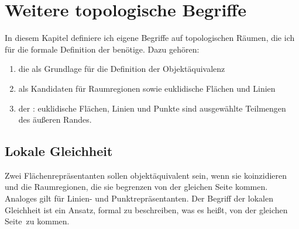 \chapter{Weitere topologische Begriffe}\label{chap:topologie-erweiterung}

In diesem Kapitel definiere ich eigene Begriffe auf topologischen Räumen, die ich für die formale Definition der \strukt benötige.
Dazu gehören:
\begin{enumerate}
    \item die  als Grundlage für die Definition der Objektäquivalenz
    \item {} als Kandidaten für Raumregionen sowie euklidische Flächen und Linien
    \item der : euklidische Flächen, Linien und Punkte sind ausgewählte Teilmengen des äußeren Randes.
\end{enumerate}


    


\section{Lokale Gleichheit}\label{sec:lokale-gleichheit}
    Zwei
    Flächenrepräsentanten sollen objektäquivalent sein, 
    wenn sie koinzidieren und die Raumregionen, die sie begrenzen \glqq von der gleichen Seite kommen\grqq. 
    Analoges gilt für Linien- und Punktrepräsentanten. 
    Der Begriff der lokalen Gleichheit ist ein Ansatz, formal zu beschreiben, was es heißt, \glqq von der gleichen Seite\grqq\ zu kommen.
    
